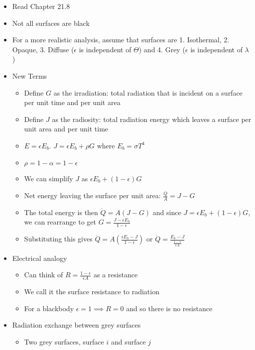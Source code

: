 \documentclass[12pt]{article}
\begin{document}
\begin{itemize}
    \item Read Chapter 21.8
    \item Not all surfaces are black 
    \item For a more realistic analysis, assume that surfaces are 1. Isothermal, 2. Opaque, 3. Diffuse ($\epsilon$ is independent of $\Theta$) and 4. Grey ($\epsilon$ is independent of $\lambda$)
    \item New Terms \begin{itemize}
        \item Define $G$ as the irradiation: total radiation that is incident on a surface per unit time and per unit area 
        \item Define $J$ as the radiosity: total radiation energy which leaves a surface per unit area and per unit time 
        \item $E = \epsilon E_b$. $J = \epsilon E_b + \rho G$ where $E_b = \sigma T^4$
        \item $\rho = 1 - \alpha = 1 -\epsilon$ 
        \item We can simplify $J$ as $\epsilon E_b + (1-\epsilon) G$
        \item Net energy leaving the surface per unit area: $\frac{\dot{Q}}{A} = J - G$ 
        \item The total energy is then $\dot{Q} = A(J - G)$ and since $J = \epsilon E_b + (1-\epsilon) G$, we can rearrange to get $G = \frac{J - \epsilon E_b}{1 - \epsilon}$
        \item Substituting this gives $\dot{Q} = A \left( \frac{\epsilon E_b - J}{1- \epsilon} \right)$ or $\dot{Q} = \frac{E_b - J}{ \frac{1 - \epsilon}{\epsilon A}}$
    \end{itemize}
    \item Electrical analogy \begin{itemize}
        \item Can think of $R = \frac{1 - \epsilon}{\epsilon A}$ as a resistance 
        \item We call it the surface resistance to radiation 
        \item For a blackbody $\epsilon = 1 \implies R = 0$ and so there is no resistance 
    \end{itemize}
    \item Radiation exchange between grey surfaces \begin{itemize}
        \item Two grey surfaces, surface $i$ and surface $j$

\end{itemize}
\end{itemize}
\end{document}
